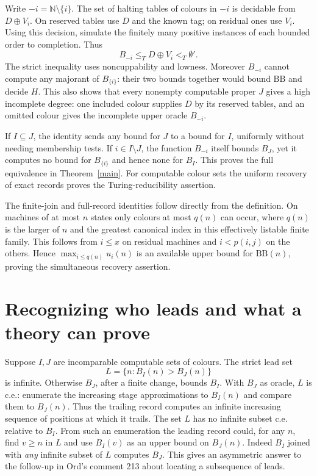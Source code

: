 \documentclass[11pt]{article}
\newcommand{\BB}{\mathrm{BB}}
\newcommand{\om}{\mathbb N}
\begin{document}
Write $-i=\om\setminus\{i\}$. The set of halting tables of colours in $-i$ is decidable from $D\oplus V_i$. On reserved tables use $D$ and the known tag; on residual ones use $V_i$. Using this decision, simulate the finitely many positive instances of each bounded order to completion. Thus
\[
                    B_{-i}\le_T D\oplus V_i<_T\emptyset'.
\]
The strict inequality uses noncuppability and lowness. Moreover $B_{-i}$ cannot compute any majorant of $B_{\{i\}}$: their two bounds together would bound $\BB$ and decide $H$. This also shows that every nonempty computable proper $J$ gives a high incomplete degree: one included colour supplies $D$ by its reserved tables, and an omitted colour gives the incomplete upper oracle $B_{-i}$.

If $I\subseteq J$, the identity sends any bound for $J$ to a bound for $I$, uniformly without needing membership tests. If $i\in I\setminus J$, the function $B_{-i}$ itself bounds $B_J$, yet it computes no bound for $B_{\{i\}}$ and hence none for $B_I$. This proves the full equivalence in Theorem~\ref{main}. For computable colour sets the uniform recovery of exact records proves the Turing-reducibility assertion.

The finite-join and full-record identities follow directly from the definition. On machines of at most $n$ states only colours at most $q(n)$ can occur, where $q(n)$ is the larger of $n$ and the greatest canonical index in this effectively listable finite family. This follows from $i\le x$ on residual machines and $i<p(i,j)$ on the others. Hence $\max_{i\le q(n)}u_i(n)$ is an available upper bound for $\BB(n)$, proving the simultaneous recovery assertion.

\section{Recognizing who leads and what a theory can prove}
Suppose $I,J$ are incomparable computable sets of colours. The strict lead set
\[
                 L=\{n:B_I(n)>B_J(n)\}
\]
is infinite. Otherwise $B_J$, after a finite change, bounds $B_I$. With $B_J$ as oracle, $L$ is c.e.: enumerate the increasing stage approximations to $B_I(n)$ and compare them to $B_J(n)$. Thus the trailing record computes an infinite increasing sequence of positions at which it trails. The set $L$ has no infinite subset c.e. relative to $B_I$. From such an enumeration the leading record could, for any $n$, find $v\ge n$ in $L$ and use $B_I(v)$ as an upper bound on $B_J(n)$. Indeed $B_I$ joined with \emph{any} infinite subset of $L$ computes $B_J$. This gives an asymmetric answer to the follow-up in Ord's comment 213 about locating a subsequence of leads.
\end{document}
